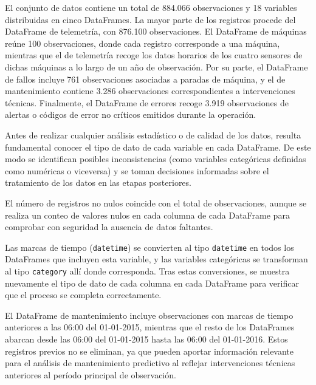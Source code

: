 \documentclass[IB]{TFUOC}
\begin{document}
El conjunto de datos contiene un total de 884.066 observaciones y 18 variables distribuidas en cinco DataFrames. La
mayor parte de los registros procede del DataFrame de telemetría, con 876.100 observaciones. El DataFrame de máquinas
reúne 100 observaciones, donde cada registro corresponde a una máquina, mientras que el de telemetría recoge los datos
horarios de los cuatro sensores de dichas máquinas a lo largo de un año de observación. Por su parte, el DataFrame de
fallos incluye 761 observaciones asociadas a paradas de máquina, y el de mantenimiento contiene 3.286 observaciones
correspondientes a intervenciones técnicas. Finalmente, el DataFrame de errores recoge 3.919 observaciones de alertas o
códigos de error no críticos emitidos durante la operación.

Antes de realizar cualquier análisis estadístico o de calidad de los datos, resulta fundamental conocer el tipo de dato
de cada variable en cada DataFrame. De este modo se identifican posibles inconsistencias (como variables categóricas
definidas como numéricas o viceversa) y se toman decisiones informadas sobre el tratamiento de los datos en las etapas
posteriores.

El número de registros no nulos coincide con el total de observaciones, aunque se realiza un conteo de valores nulos en
cada columna de cada DataFrame para comprobar con seguridad la ausencia de datos faltantes.

Las marcas de tiempo (\texttt{datetime}) se convierten al tipo \texttt{datetime} en todos los DataFrames que incluyen
esta variable, y las variables categóricas se transforman al tipo \texttt{category} allí donde corresponda. Tras estas
conversiones, se muestra nuevamente el tipo de dato de cada columna en cada DataFrame para verificar que el proceso se
completa correctamente.

El DataFrame de mantenimiento incluye observaciones con marcas de tiempo anteriores a las 06:00 del 01-01-2015, mientras
que el resto de los DataFrames abarcan desde las 06:00 del 01-01-2015 hasta las 06:00 del 01-01-2016. Estos registros
previos no se eliminan, ya que pueden aportar información relevante para el análisis de mantenimiento predictivo al
reflejar intervenciones técnicas anteriores al período principal de observación.
\end{document}
